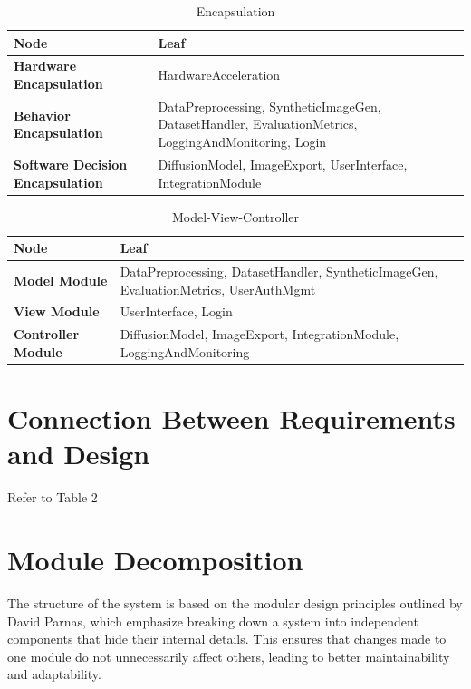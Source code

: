\documentclass[12pt, titlepage]{article}
\begin{document}
\begin{table}[H]
  \caption{Encapsulation}
  \begin{tabular}{l|p{9cm}}
  \textbf{Node} & \textbf{Leaf} \\
  \hline
  \textbf{Hardware Encapsulation} & HardwareAcceleration  \\
  \textbf{Behavior Encapsulation} & DataPreprocessing, SyntheticImageGen, \newline DatasetHandler, EvaluationMetrics, \newline LoggingAndMonitoring, Login  \\
  \textbf{Software Decision Encapsulation} & DiffusionModel, ImageExport, UserInterface, \newline IntegrationModule
  \end{tabular}
\end{table}


\begin{table}[H]
  \caption{Model-View-Controller}
  \begin{tabular}{l|p{9cm}}
  \textbf{Node} & \textbf{Leaf} \\
  \hline
  \textbf{Model Module} & DataPreprocessing, DatasetHandler, \newline SyntheticImageGen, EvaluationMetrics, \newline UserAuthMgmt \\
  \textbf{View Module} & UserInterface, Login \\
  \textbf{Controller Module} & DiffusionModel, ImageExport, IntegrationModule, LoggingAndMonitoring
  \end{tabular}
\end{table}

\section{Connection Between Requirements and Design} \label{SecConnection}
Refer to Table 2

\section{Module Decomposition} \label{SecMD}

The structure of the system is based on the modular design principles outlined by David Parnas, which emphasize breaking down a system into independent components that hide their internal details. This ensures that changes made to one module do not unnecessarily affect others, leading to better maintainability and adaptability.
\end{document}
